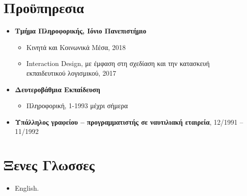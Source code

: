 \documentclass[%
    11pt,
  oneside
  ]{memoir}
\let\oldsection\section
\renewcommand{\section}[1]{%
  \oldsection{#1}
  \leavevmode
  \par
  \vspace{\dimexpr-\baselineskip-\parskip}
}
\begin{document}
\hypertarget{ux3c0ux3c1ux3bfux3cbux3c0ux3b7ux3c1ux3b5ux3c3ux3b9ux3b1}{%
\section{Προϋπηρεσια}\label{ux3c0ux3c1ux3bfux3cbux3c0ux3b7ux3c1ux3b5ux3c3ux3b9ux3b1}}

\begin{itemize}
\tightlist
\item
  \textbf{Τμήμα Πληροφορικής, Ιόνιο Πανεπιστήμιο}

  \begin{itemize}
  \tightlist
  \item
    Κινητά και Κοινωνικά Μέσα, 2018
  \item
    Interaction Design, με έμφαση στη σχεδίαση και την κατασκευή
    εκπαιδευτικού λογισμικού, 2017
  \end{itemize}
\item
  \textbf{Δευτεροβάθμια Εκπαίδευση}

  \begin{itemize}
  \tightlist
  \item
    Πληροφορική, 1-1993 μέχρι σήμερα
  \end{itemize}
\item
  \textbf{Υπάλληλος γραφείου -- προγραμματιστής σε ναυτιλιακή εταιρεία},
  12/1991 -- 11/1992
\end{itemize}

\hypertarget{ux3beux3b5ux3bdux3b5ux3c2-ux3b3ux3bbux3c9ux3c3ux3c3ux3b5ux3c2}{%
\section{Ξενες
Γλωσσες}\label{ux3beux3b5ux3bdux3b5ux3c2-ux3b3ux3bbux3c9ux3c3ux3c3ux3b5ux3c2}}

\begin{itemize}
\tightlist
\item
  English.
\end{itemize}
\end{document}

